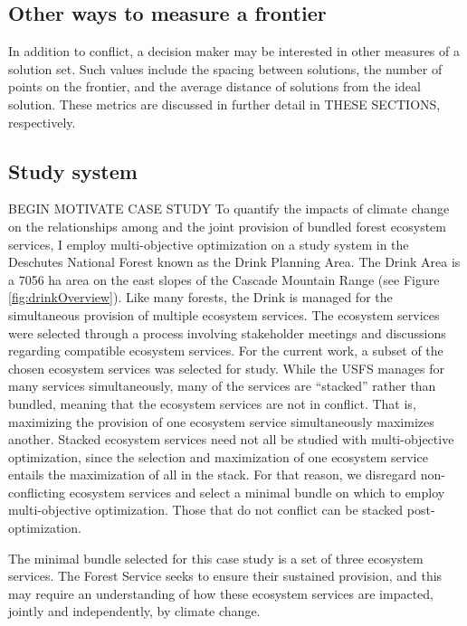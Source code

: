 \subsection{Other ways to measure a frontier}
In addition to conflict, a decision maker may be interested in other measures of a solution set. Such values include the spacing between solutions, the number of points on the frontier, and the average distance of solutions from the ideal solution. These metrics are discussed in further detail in THESE SECTIONS, respectively.

\subsection{Study system}
\label{subsec:studyArea}
BEGIN MOTIVATE CASE STUDY
To quantify the impacts of climate change on the relationships among and the joint provision of bundled forest ecosystem services, I employ multi-objective optimization on a study system in the Deschutes National Forest known as the Drink Planning Area. The Drink Area is a 7056 ha area on the east slopes of the Cascade Mountain Range (see Figure \ref{fig:drinkOverview}). Like many forests, the Drink is managed for the simultaneous provision of multiple ecosystem services.  The ecosystem services were selected through a process involving stakeholder meetings and discussions regarding compatible ecosystem services. For the current work, a subset of the chosen ecosystem services was selected for study. While the USFS manages for many services simultaneously, many of the services are ``stacked'' rather than bundled, meaning that the ecosystem services are not in conflict. That is, maximizing the provision of one ecosystem service simultaneously maximizes another. Stacked ecosystem services need not all be studied with multi-objective optimization, since the selection and maximization of one ecosystem service entails the maximization of all in the stack. For that reason, we disregard non-conflicting ecosystem services and select a minimal bundle on which to employ multi-objective optimization. Those that do not conflict can be stacked post-optimization.

The minimal bundle selected for this case study is a set of three ecosystem services. The Forest Service seeks to ensure their sustained provision, and this may require an understanding of how these ecosystem services are impacted, jointly and independently, by climate change.

